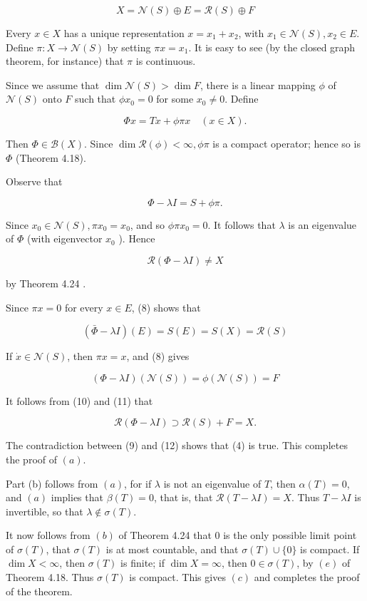 \documentclass[10pt]{article}
\begin{document}
$$
X=\mathscr{N}(S) \oplus E=\mathscr{R}(S) \oplus F
$$

Every $x \in X$ has a unique representation $x=x_{1}+x_{2}$, with $x_{1} \in \mathscr{N}(S), x_{2} \in E$. Define $\pi: X \rightarrow \mathscr{N}(S)$ by setting $\pi x=x_{1}$. It is easy to see (by the closed graph theorem, for instance) that $\pi$ is continuous.

Since we assume that $\operatorname{dim} \mathscr{N}(S)>\operatorname{dim} F$, there is a linear mapping $\phi$ of $\mathscr{N}(S)$ onto $F$ such that $\phi x_{0}=0$ for some $x_{0} \neq 0$. Define

$$
\Phi x=T x+\phi \pi x \quad(x \in X) .
$$

Then $\Phi \in \mathscr{B}(X)$. Since $\operatorname{dim} \mathscr{R}(\phi)<\infty, \phi \pi$ is a compact operator; hence so is $\Phi$ (Theorem 4.18).

Observe that

$$
\Phi-\lambda I=S+\phi \pi .
$$

Since $x_{0} \in \mathscr{N}(S), \pi x_{0}=x_{0}$, and so $\phi \pi x_{0}=0$. It follows that $\lambda$ is an eigenvalue of $\Phi$ (with eigenvector $x_{0}$ ). Hence

$$
\mathscr{R}(\Phi-\lambda I) \neq X
$$

by Theorem 4.24 .

Since $\pi x=0$ for every $x \in E$, (8) shows that

$$
(\bar{\Phi}-\lambda I)(E)=S(E)=S(X)=\mathscr{R}(S)
$$

If $\dot{x} \in \mathscr{N}(S)$, then $\pi x=x$, and (8) gives

$$
(\Phi-\lambda I)(\mathscr{N}(S))=\phi(\mathscr{N}(S))=F
$$

It follows from (10) and (11) that

$$
\mathscr{R}(\Phi-\lambda I) \supset \mathscr{R}(S)+F=X .
$$

The contradiction between (9) and (12) shows that (4) is true. This completes the proof of $(a)$.

Part (b) follows from $(a)$, for if $\lambda$ is not an eigenvalue of $T$, then $\alpha(T)=0$, and $(a)$ implies that $\beta(T)=0$, that is, that $\mathscr{R}(T-\lambda I)=X$. Thus $T-\lambda I$ is invertible, so that $\lambda \notin \sigma(T)$.

It now follows from $(b)$ of Theorem 4.24 that 0 is the only possible limit point of $\sigma(T)$, that $\sigma(T)$ is at most countable, and that $\sigma(T) \cup\{0\}$ is compact. If $\operatorname{dim} X<\infty$, then $\sigma(T)$ is finite; if $\operatorname{dim} X=\infty$, then $0 \in \sigma(T)$, by $(e)$ of Theorem 4.18. Thus $\sigma(T)$ is compact. This gives $(c)$ and completes the proof of the theorem.
\end{document}
